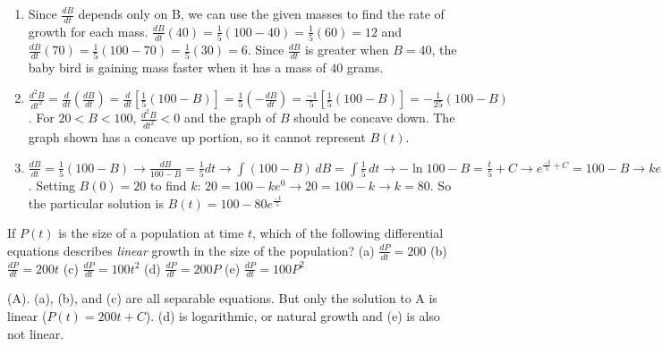 \begin{Answer}[ref = diffeq2]
\begin{enumerate}
\item Since $\frac{dB}{dt}$ depends only on B, we can use the given masses to 
find the rate of growth for each mass. $\frac{dB}{dt}(40) = \frac{1}{5} \left( 
100 - 40 \right) = \frac{1}{5} \left(60 \right) = 12$ and $\frac{dB}{dt}(70) = 
\frac{1}{5} \left( 100 - 70 \right) = \frac{1}{5} \left( 30 \right) = 6$. 
Since $\frac{dB}{dt}$ is greater when $B = 40$, the baby bird is gaining mass 
faster when it has a mass of $40$ grams. 
\item $\frac{d^2 B}{dt^2} = \frac{d}{dt} \left( \frac{dB}{dt} \right) = 
\frac{d}{dt} \left[ \frac{1}{5} \left(100 - B \right) \right] = \frac{1}{5} 
\left( -\frac{dB}{dt} \right) = \frac{-1}{5} \left[\frac{1}{5} \left( 100 - B 
\right) \right] = -\frac{1}{25} \left(100 - B \right)$. For $20 < B < 100$, 
$\frac{d^2 B}{dt^2} < 0$ and the graph of $B$ should be concave down. The 
graph shown has a concave up portion, so it cannot represent $B(t)$. 
\item $\frac{dB}{dt} = \frac{1}{5} \left( 100 - B \right) \rightarrow 
\frac{dB}{100 - B} = \frac{1}{5} dt \rightarrow \int \left(100 - B \right)\,dB 
= \int \frac{1}{5}\,dt \rightarrow -\ln{100 - B} = \frac{t}{5} + C \rightarrow 
e^{\frac{-t}{5} + C} = 100 - B \rightarrow ke^{\frac{-t}{5}} = 100 - B 
\rightarrow B(t) = 100 - ke^{\frac{-t}{5}}$. Setting $B(0) = 20$ to find $k$: 
$20 = 100 - ke^{0} \rightarrow 20 = 100 - k \rightarrow k = 80$. So the 
particular solution is $B(t) = 100 - 80e^{\frac{-t}{5}}$
\end{enumerate}
\end{Answer}

\begin{Exercise} If $P(t)$ is the size of a 
population at time $t$, which of the following differential equations 
describes \textit{linear} growth in the size of the population?
(a) $\frac{dP}{dt} = 200$
(b) $\frac{dP}{dt} = 200t$
(c) $\frac{dP}{dt} = 100t^2$
(d) $\frac{dP}{dt} = 200P$
(e) $\frac{dP}{dt} = 100P^2$
\end{Exercise}

\begin{Answer}[ref = popgrowth]
(A). (a), (b), and (c) are all separable equations. But only the solution to A 
is linear ($P(t) = 200t + C$). (d) is logarithmic, or natural growth and (e) 
is also not linear.
\end{Answer}
